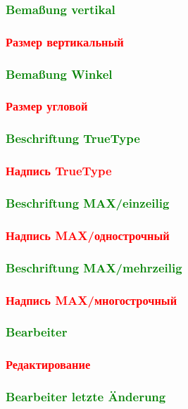 \documentclass[14pt,a4paper]{book}
\newcommand{\DE}[1]{\textcolor{green}{#1}}
\newcommand{\RU}[1]{\textcolor{red}{#1}}
\begin{document}
			\DE{\subsubsection{Bemaßung vertikal}}
			\RU{\subsubsection{Размер вертикальный}}
			\DE{\subsubsection{Bemaßung Winkel}}
			\RU{\subsubsection{Размер угловой}}
			\DE{\subsubsection{Beschriftung TrueType}} 
			\RU{\subsubsection{Надпись TrueType}} 
			\DE{\subsubsection{Beschriftung MAX/einzeilig}} 
			\RU{\subsubsection{Надпись MAX/однострочный}} 
			\DE{\subsubsection{Beschriftung MAX/mehrzeilig}}
			\RU{\subsubsection{Надпись MAX/многострочный}}
			\DE{\subsubsection{Bearbeiter}}
			\RU{\subsubsection{Редактирование}}
			\DE{\subsubsection{Bearbeiter letzte Änderung}}
\end{document}
